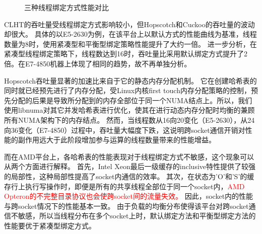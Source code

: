 \begin{figure}[htbp]
\centering
\caption{三种线程绑定方式性能对比}
\label{fig:pin}
\end{figure}

CLHT的吞吐量受线程绑定方式影响较小，但Hopscotch和Cuckoo的吞吐量的波动却很大。
具体的以E5-2630为例，在该平台上以默认方式的性能曲线为基准，线程数量为8时，使用紧凑型和平衡型绑定策略性能提升了大约一倍。
进一步分析，在紧凑型线程绑定策略下，线程数达到16时，吞吐量比采用默认绑定方式提升了2倍。在E7-4850机器上体现了相同的趋势，故不再单独分析。

Hopscotch吞吐量显著的加速比来自于它的静态内存分配机制。
它在创建哈希表的同时就已经预先进行了内存分配，受Linux内核first 
touch内存分配策略的控制，预先分配的后果是导致所分配到的内存全部位于同一个NUMA结点上。所以，我们使用libnuma对其它并发哈希表进行优化，使其在进行动态内存分配时均衡的兼顾所有NUMA架构下的内存结点。
然而，当线程数从16向20变化（E5-2630），从24向36变化（E7-4850）过程中，吞吐量大幅度下跌，这说明跨socket通信开销对性能的副作用远大于此阶段增加参与运算的线程数量带来的性能增益。

而在AMD平台上，各哈希表的性能表现对于线程绑定方式不敏感，这个现象可以从两个方面进行解释。
首先，Intel Xeon最后一级缓存的inclusive特性提供了较强的局部性，这种局部性提高了socket内通信的效率。
其次，在状态为’O’和’S’的缓存行上执行写操作时，即便是所有的共享线程全部位于同一个socket内，\textcolor{red}{AMD Opteron的不完整目录协议也会使跨socket间的流量失效。}
因此，socket内的性能与跨socket情况下的性能基本一致。
由于负载的均衡分布使得该平台对跨socket通信不敏感，所以当线程分布在多个socket上时，默认绑定方法和平衡型绑定方法的性能要优于紧凑型绑定方式。

